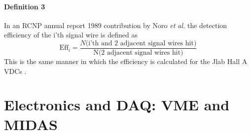 \documentclass[11pt]{report}
\begin{document}
\subsubsection{Definition 3}
In an RCNP annual report 1989 contribution by Noro {\it et al.} the detection efficiency of the i'th
signal wire is defined as 
\begin{equation} 
\textrm{Eff}_{i} = \frac{N(\textrm{i'th and 2 adjacent signal wires hit)}}{\textrm{N(2 adjacent signal wires hit)}}
\end{equation} 
This is the same manner in which the efficiency is calculated for the Jlab Hall A VDCs \cite{Fis01}.



















\chapter{Electronics and DAQ: VME and MIDAS}\label{chap:daq-and-electronics-new}
 
\end{document}
